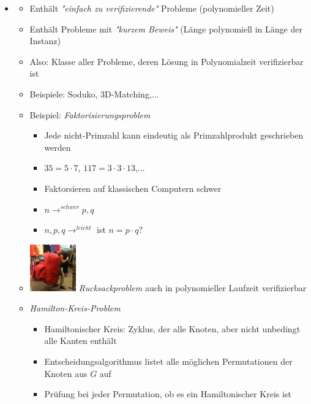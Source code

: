 \documentclass[
    12pt,
    a4paper,
    ngerman,
    color=3b,%
    marginpar=false,
    colorback=false,
    leqno,
]{tudaexercise}
\begin{document}
\begin{itemize}
    \item {}
          \begin{itemize}
              \item Enthält \textit{\string"einfach zu verifizierende\string"} Probleme (polynomieller Zeit)
              \item Enthält Probleme mit \textit{\string"kurzem Beweis\string"} (Länge polynomiell in Länge der Instanz)
              \item Also: Klasse aller Probleme, deren Lösung in Polynomialzeit verifizierbar ist
              \item Beispiele: Soduko, 3D-Matching,...
              \item Beispiel: \textit{Faktorisierungsproblem}
                    \begin{itemize}
                        \item Jede nicht-Primzahl kann eindeutig als Primzahlprodukt geschrieben werden
                        \item $35 = 5 \cdot 7$, $117 = 3 \cdot 3 \cdot 13$,...
                        \item Faktorsieren auf klassischen Computern schwer
                        \item $n \longrightarrow^{schwer} p,q$
                        \item $n,p,q \longrightarrow^{leicht}$ ist $n = p \cdot q?$
                    \end{itemize}
              \item \includegraphics[width=2cm]{pictures/rucksackproblem.png} \textit{Rucksackproblem} auch in polynomieller Laufzeit verifizierbar
                    \clearpage
              \item \textit{Hamilton-Kreis-Problem}
                    \begin{itemize}
                        \item Hamiltonischer Kreis: Zyklus, der alle Knoten, aber nicht unbedingt alle Kanten enthält
                        \item Entscheidungsalgorithmus listet alle möglichen Permutationen der Knoten aus $G$ auf
                        \item Prüfung bei jeder Permutation, ob es ein Hamiltonischer Kreis ist

\end{itemize}
\end{itemize}
\end{itemize}
\end{document}
